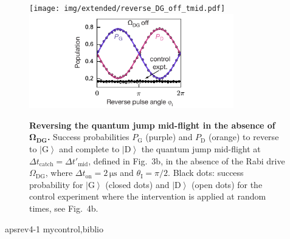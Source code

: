 \documentclass[
	 			preprint,     		superscriptaddress, 																longbibliography,
		amsmath, amssymb,
		aps,  prb,   		floatfix,
		linenumbers     
	]{revtex4-1}
\newcommand{\nociteMethods}{\nocite}
\newcommand{\bibliographystyleMethods}{}
\newcommand{\bibliographyMethods}{}
\newcommand{\ket}[1]{\left|#1\right>}
\begin{document}
\begin{figure}[!ht]
\begin{centering}
\ifjournal
	\texttt{[image: img/extended/reverse\_DG\_off\_tmid.pdf]} 
\else
	\includegraphics[width=89mm]{reverse_DG_off_tmid.pdf} 
\fi
\caption{ \label{fig:reverseDGoff}
\textbf{Reversing the quantum jump mid-flight in the absence of $\mathbf{\Omega_\mathrm{\textbf{DG}}}$.}  
Success probabilities $P_\mathrm G$ (purple) and $P_\mathrm D$ (orange) to reverse to $\ket{\mathrm G}$ and complete to $\ket{\mathrm D}$ the quantum jump mid-flight at $\Delta t_{\mathrm{catch}} = \Delta t'_{\mathrm{mid}}$, defined in Fig.~3b, in the absence of the Rabi drive $\Omega_\mathrm{DG}$, where $\Delta t_\mathrm{on} = 2\, \mathrm{\mu s}$ and $\theta_\mathrm I = \pi/2$.
Black dots:  success probability for $\ket{\mathrm G}$ (closed dots) and $\ket{\mathrm D}$ (open dots) for the control experiment where the intervention is applied at random times, see Fig.~4b.
}
\end{centering}
\end{figure}




\clearpage
\nociteMethods{apsrev41Control} 
\bibliographystyleMethods{apsrev4-1}
\bibliographyMethods{mycontrol,biblio}
\end{document}
